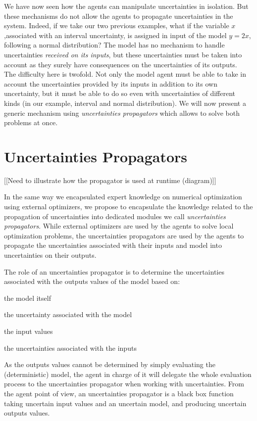 We have now seen how the agents can manipulate uncertainties in isolation. But these mechanisms do not allow the agents to propagate uncertainties in the system. Indeed, if we take our two previous examples, what if the variable $x$ ,associated with an interval uncertainty, is assigned in input of the model $y = 2x$, following a normal distribution? The model has no mechanism to handle uncertainties \emph{received on its inputs}, but these uncertainties must be taken into account as they surely have consequences on the uncertainties of its outputs.\\
The difficulty here is twofold. Not only the model agent must be able to take in account the uncertainties provided by its inputs in addition to its own uncertainty, but it must be able to do so even with uncertainties of different kinds (in our example, interval and normal distribution). We will now present a generic mechanism using \emph{uncertainties propagators} which allows to solve both problems at once.

\section{Uncertainties Propagators}

[[Need to illustrate how the propagator is used at runtime (diagram)]]

In the same way we encapsulated expert knowledge on numerical optimization using external optimizers, we propose to encapsulate the knowledge related to the propagation of uncertainties into dedicated modules we call \emph{uncertainties propagators}. While external optimizers are used by the agents to solve local optimization problems, the uncertainties propagators are used by the agents to propagate the uncertainties associated with their inputs and model into uncertainties on their outputs.

The role of an uncertainties propagator is to determine the uncertainties associated with the outputs values of the model based on:
\begin{compactitem}
\item the model itself
\item the uncertainty associated with the model
\item the input values
\item the uncertainties associated with the inputs
\end{compactitem}

As the outputs values cannot be determined by simply evaluating the (deterministic) model, the agent in charge of it will delegate the whole evaluation process to the uncertainties propagator when working with uncertainties. From the agent point of view, an uncertainties propagator is a black box function taking uncertain input values and an uncertain model, and producing uncertain outputs values.

